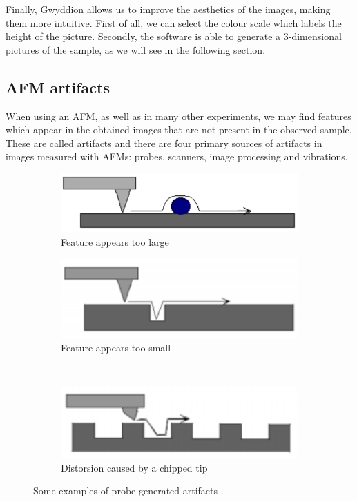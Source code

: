 \documentclass[11pt,a4paper]{article}
\begin{document}
Finally, Gwyddion allows us to improve the aesthetics of the images, making them more intuitive. First of all, we can select the colour scale which labels the height of the picture. Secondly, the software is able to generate a 3-dimensional pictures of the sample, as we will see in the following section.

\subsection{AFM artifacts}
When using an AFM, as well as in many other experiments, we may find features which appear in the obtained images that are not present in the observed sample. These are called artifacts \cite{artifacts} and there are four primary sources of artifacts in images measured with AFMs: probes, scanners, image processing and vibrations.

\begin{figure}[ht]
\centering
\begin{subfigure}[b]{0.45\textwidth}
\includegraphics[width=\textwidth]{artifacts_probe_1}
\caption{Feature appears too large}
\label{fig:artifacts_probe_1}
\end{subfigure}
\begin{subfigure}[b]{0.45\textwidth}
\includegraphics[width=\textwidth]{artifacts_probe_2}
\caption{Feature appears too small}
\label{fig:artifacts_probe_2}
\end{subfigure}\\\vspace{.2cm}
\begin{subfigure}[b]{0.45\textwidth}
\includegraphics[width=\textwidth]{artifacts_probe_3}
\caption{Distorsion caused by a chipped tip}
\label{fig:artifacts_probe_3}
\end{subfigure}
\caption{Some examples of probe-generated artifacts \cite{artifacts}.}
\label{fig:artifacts_probe}
\end{figure}
\end{document}
